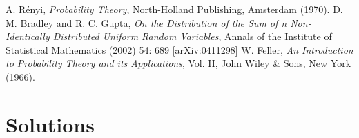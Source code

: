 \documentclass{article}
\newcommand{\1}{{\rm I}}
\def\doi{http://dx.doi.org/}
\begin{document}
\begin{thebibliography}{99}
 A. R\'enyi, \emph{Probability Theory}, North-Holland Publishing, Amsterdam (1970).
 D. M. Bradley and R. C. Gupta, \emph{On the Distribution of the Sum of n Non-Identically Distributed Uniform Random Variables}, Annals of the Institute of Statistical Mathematics (2002) 54: \href{\doi10.1023/A:1022483715767}{689} [arXiv:\href{https://arxiv.org/abs/math/0411298}{0411298}]
 W. Feller, \emph{An Introduction to Probability Theory and its Applications}, Vol. II, John Wiley \& Sons, New York (1966).
\end{thebibliography}
\newpage
\section{Solutions }
\end{document}

